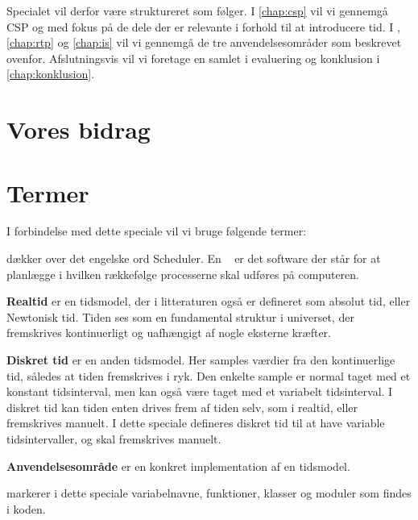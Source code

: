 Specialet vil derfor være struktureret som følger. I \autoref{chap:csp} vil vi gennemgå CSP og \pycsp med fokus på de dele der er relevante i forhold til at introducere tid. I , \ref{chap:rtp} og \ref{chap:is} vil vi gennemgå de tre anvendelsesområder som beskrevet ovenfor. Afslutningsvis vil vi foretage en samlet i evaluering og konklusion i \autoref{chap:konklusion}.



\section{Vores bidrag}
\section{Termer}
I forbindelse med dette speciale vil vi bruge følgende termer:
\begin{list}{}{}
\item \textbf{\Sched} dækker over det engelske ord Scheduler. En \sched~ er det software der står for at planlægge i hvilken rækkefølge processerne skal udføres på computeren.
\item \textbf{Realtid} er en tidsmodel, der i litteraturen også er defineret som absolut tid, eller Newtonisk tid. Tiden ses som en fundamental struktur i universet, der 
fremskrives kontinuerligt og uafhængigt af nogle eksterne kræfter.
\item \textbf{Diskret tid} er en anden tidsmodel. Her samples værdier fra den kontinuerlige tid, således at tiden fremskrives i ryk. Den enkelte sample er normal taget med et konstant tidsinterval, men kan også være taget med et variabelt tidsinterval. I diskret tid kan tiden enten drives frem af tiden selv, som i realtid, eller fremskrives manuelt. I dette speciale defineres diskret tid til at have variable tidsintervaller, og skal fremskrives manuelt.
\item \textbf{Anvendelsesområde} er en konkret implementation af en tidsmodel.
\item \textbf{} markerer i dette speciale variabelnavne, funktioner,  klasser og moduler som findes i koden. 
\end{list}



